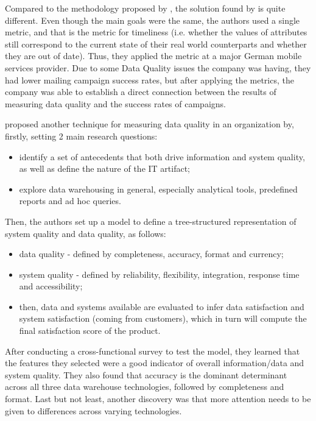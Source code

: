 \documentclass{mprop}
\begin{document}
Compared to the methodology proposed by \citet{lee2002aimq}, the solution found
by \citet{Heinrich2007MetricsDataQuality} is quite different. Even though the 
main goals were the same, the authors used a single metric, and that is 
the metric for timeliness (i.e. whether the values of attributes still 
correspond to the current state of their real world counterparts and whether 
they are out of date). Thus, they applied the metric at a major German mobile 
services provider. Due to some Data Quality issues the company was having, they 
had lower mailing campaign success rates, but after applying the metrics, the 
company was able to establish a direct connection between the results of
measuring data quality and the success rates of campaigns.

\citet{nelson2005antecedents} proposed another technique for measuring data 
quality in an organization by, firstly, setting 2 main research questions:
  \begin{itemize}
    \item identify a set of antecedents that both drive information and
      system quality, as well as define the nature of the IT artifact;
    \item explore data warehousing in general, especially analytical tools,
      predefined reports and ad hoc queries.
  \end{itemize}

Then, the authors set up a model to define a tree-structured representation
of system quality and data quality, as follows:
  \begin{itemize}
    \item data quality - defined by completeness, accuracy, format and currency;
    \item system quality - defined by reliability, flexibility, integration,
    response time and accessibility;
    \item then, data and systems available are evaluated to infer 
    data satisfaction and system satisfaction (coming from customers), which
    in turn will compute the final satisfaction score of the product.
  \end{itemize}

After conducting a cross-functional survey to test the model, they learned that
the features they selected were a good indicator of overall information/data and
system quality. They also found that accuracy is the dominant determinant across
all three data warehouse technologies, followed by completeness and format. Last
but not least, another discovery was that more attention needs to be given to
differences across varying technologies.
\end{document}
